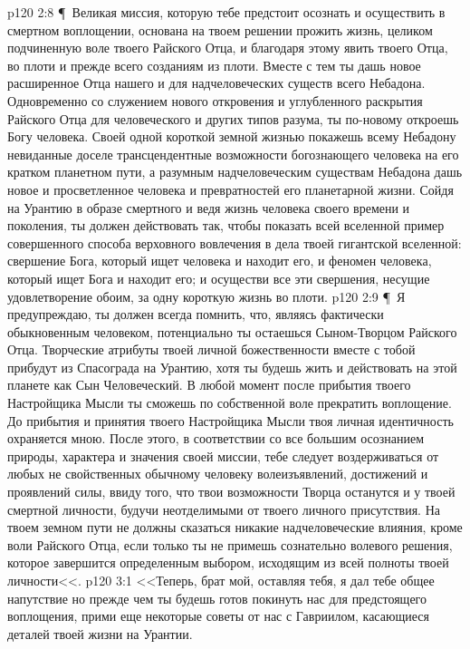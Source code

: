 \vs p120 2:8 \P\ \bibnobreakspace Великая миссия, которую тебе предстоит осознать и осуществить в смертном воплощении, основана на твоем решении прожить жизнь, целиком подчиненную воле твоего Райского Отца, и благодаря этому явить  твоего Отца, во плоти и прежде всего созданиям из плоти. Вместе с тем ты дашь новое расширенное  Отца нашего и для надчеловеческих существ всего Небадона. Одновременно со служением нового откровения и углубленного раскрытия Райского Отца для человеческого и других типов разума, ты по\hyp{}новому откроешь Богу человека. Своей одной короткой земной жизнью покажешь всему Небадону невиданные доселе трансцендентные возможности богознающего человека на его кратком планетном пути, а разумным надчеловеческим существам Небадона дашь новое и просветленное  человека и превратностей его планетарной жизни. Сойдя на Урантию в образе смертного и ведя жизнь человека своего времени и поколения, ты должен действовать так, чтобы показать всей вселенной пример совершенного способа верховного вовлечения в дела твоей гигантской вселенной: свершение Бога, который ищет человека и находит его, и феномен человека, который ищет Бога и находит его; и осуществи все эти свершения, несущие удовлетворение обоим, за одну короткую жизнь во плоти.
\vs p120 2:9 \P\ \bibnobreakspace Я предупреждаю, ты должен всегда помнить, что, являясь фактически обыкновенным человеком, потенциально ты остаешься Сыном\hyp{}Творцом Райского Отца. Творческие атрибуты твоей личной божественности вместе с тобой прибудут из Спасограда на Урантию, хотя ты будешь жить и действовать на этой планете как Сын Человеческий. В любой момент после прибытия твоего Настройщика Мысли ты сможешь по собственной воле прекратить воплощение. До прибытия и принятия твоего Настройщика Мысли твоя личная идентичность охраняется мною. После этого, в соответствии со все большим осознанием природы, характера и значения своей миссии, тебе следует воздерживаться от любых не свойственных обычному человеку волеизъявлений, достижений и проявлений силы, ввиду того, что твои возможности Творца останутся и у твоей смертной личности, будучи неотделимыми от твоего личного присутствия. На твоем земном пути не должны сказаться никакие надчеловеческие влияния, кроме воли Райского Отца, если только ты не примешь сознательно волевого решения, которое завершится определенным выбором, исходящим из всей полноты твоей личности<<.
\vs p120 3:1 <<Теперь, брат мой, оставляя тебя, я дал тебе общее напутствие но прежде чем ты будешь готов покинуть нас для предстоящего воплощения, прими еще некоторые советы от нас с Гавриилом, касающиеся деталей твоей жизни на Урантии.

